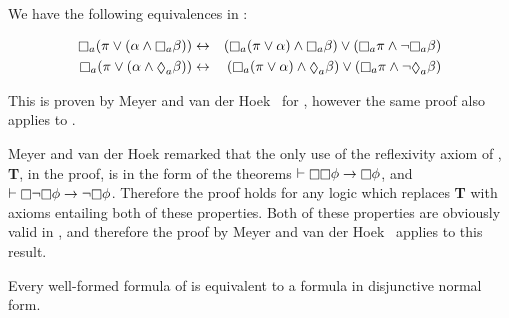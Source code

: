 \begin{lemma}\label{kd45-dnf-equivalences}
We have the following equivalences in \logicKD{}:

\begin{eqnarray*}
\knows_a (\pi \lor (\alpha \land \knows_a \beta)) &\iff& (\knows_a (\pi \lor \alpha)
\land \knows_a \beta) \lor (\knows_a \pi \land \neg \knows_a \beta)\\
\knows_a (\pi \lor (\alpha \land \suspects_a \beta)) &\iff& (\knows_a (\pi \lor \alpha)
\land \suspects_a \beta) \lor (\knows_a \pi \land \neg \suspects_a \beta)
\end{eqnarray*}
\end{lemma}

This is proven by Meyer and van der Hoek~\cite{meyer2004epistemic} for
\logicSi{}, however the same proof also applies to \logicKD{}.

Meyer and van der Hoek remarked that the only use of the reflexivity axiom of
\logicS{}, {\bf T}, in the proof, is in the form of the theorems $\proves \knows
\knows \phi \implies \knows \phi$, and $\proves \knows \neg \knows \phi \implies
\neg \knows \phi$. Therefore the proof holds for any logic which replaces {\bf
T} with axioms entailing both of these properties. Both of these properties are
obviously valid in \logicKD{}, and therefore the proof by Meyer and van der
Hoek~\cite{meyer2004epistemic} applies to this result.

\begin{lemma}\label{kd45-dnf}
Every well-formed formula of \logicKD{} is equivalent to a formula in
disjunctive normal form.
\end{lemma}

